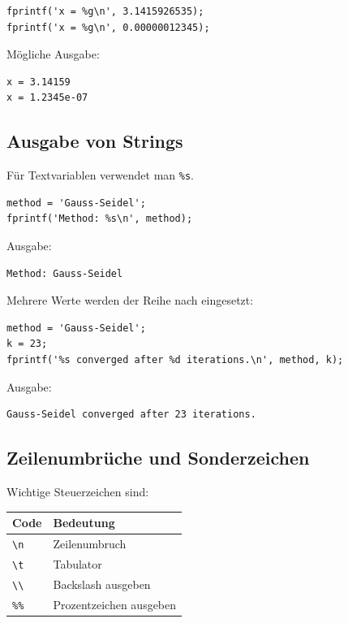 \documentclass[10pt, letterpaper]{article}
\begin{document}
\begin{verbatim}
fprintf('x = %g\n', 3.1415926535);
fprintf('x = %g\n', 0.00000012345);
\end{verbatim}

Mögliche Ausgabe:

\begin{verbatim}
x = 3.14159
x = 1.2345e-07
\end{verbatim}

\subsection{Ausgabe von Strings}

Für Textvariablen verwendet man \texttt{\%s}.

\begin{verbatim}
method = 'Gauss-Seidel';
fprintf('Method: %s\n', method);
\end{verbatim}

Ausgabe:

\begin{verbatim}
Method: Gauss-Seidel
\end{verbatim}

Mehrere Werte werden der Reihe nach eingesetzt:

\begin{verbatim}
method = 'Gauss-Seidel';
k = 23;
fprintf('%s converged after %d iterations.\n', method, k);
\end{verbatim}

Ausgabe:

\begin{verbatim}
Gauss-Seidel converged after 23 iterations.
\end{verbatim}

\subsection{Zeilenumbrüche und Sonderzeichen}

Wichtige Steuerzeichen sind:

\begin{center}
\begin{tabular}{ll}
\hline
Code & Bedeutung \\
\hline
\texttt{\textbackslash n} & Zeilenumbruch \\
\texttt{\textbackslash t} & Tabulator \\
\texttt{\textbackslash\textbackslash} & Backslash ausgeben \\
\texttt{\%\%} & Prozentzeichen ausgeben \\
\hline
\end{tabular}
\end{center}
\end{document}
